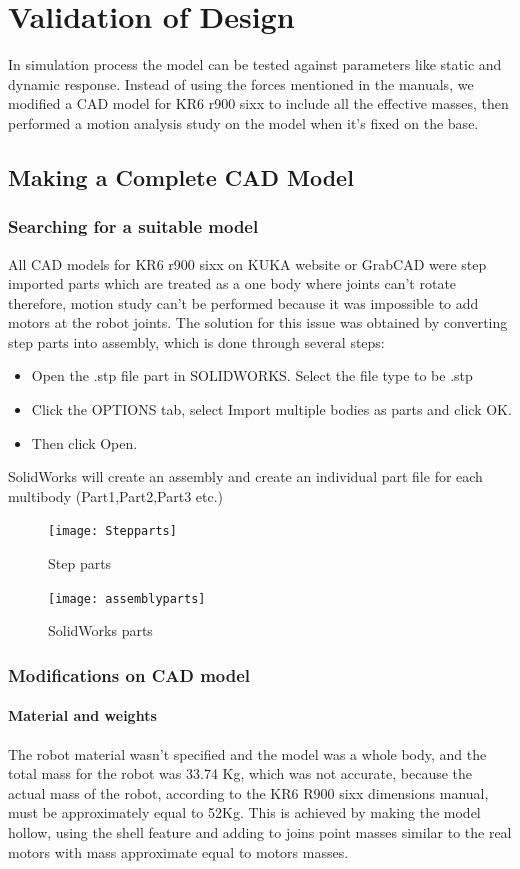 \newpage
\section{Validation of Design}

In simulation process the model can be tested against parameters like static and dynamic response. Instead of using the forces mentioned in the manuals, we modified a CAD model for KR6 r900 sixx to include all the effective masses, then performed a motion analysis study on the model when it's fixed on the base. 

\subsection{Making a Complete CAD Model}

\subsubsection{Searching for a suitable model}
All CAD models for KR6 r900 sixx on KUKA website or GrabCAD were step imported parts which are treated as a one body where joints can’t rotate therefore, motion study can’t be performed because it was impossible to add motors at the robot joints. The solution for this issue was obtained by converting step parts into assembly, which is done through several steps:
\begin{itemize}
	\item Open the .stp file part in SOLIDWORKS.  Select the file type to be .stp
	\item Click the OPTIONS tab, select Import multiple bodies as parts and click OK.
	\item Then click Open.
\end{itemize}
SolidWorks will create an assembly and create an individual part file for each multibody (Part1,Part2,Part3 etc.)
\begin{figure}[H]
	\centering
	\texttt{[image: Stepparts]}
	\caption{Step parts}
\end{figure}

\begin{figure}[H]
	\centering
	\texttt{[image: assemblyparts]}
	\caption{SolidWorks parts}
\end{figure}

\subsubsection{Modifications on CAD model}
\paragraph{Material and weights}
The robot material wasn’t specified and the model was a whole body, and the total mass for the robot was 33.74 Kg, which was not accurate, because the actual mass of the robot, according to the KR6 R900 sixx dimensions manual, must be approximately equal to 52Kg. This is achieved by making the model hollow, using the shell feature and adding to joins point masses similar to the real motors with mass approximate equal to motors masses. 

